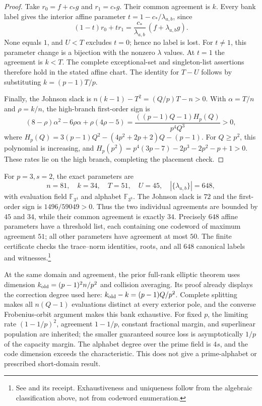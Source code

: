 \begin{proof}
Take $r_0=f+c_*g$ and $r_1=c_*g$. Their common agreement is $k$.
Every bank label gives the interior affine parameter
$t=1-c_*/\lambda_{a,b}$, since
\[
 (1-t)r_0+tr_1
 =\frac{c_*}{\lambda_{a,b}}\,(f+\lambda_{a,b}g).
\]
None equals $1$, and $U<T$ excludes $t=0$; hence no label is lost.
For $t\ne1$, this parameter change is a bijection with the
nonzero $\lambda$ values. At $t=1$ the agreement is $k<T$.
The complete exceptional-set and singleton-list assertions
therefore hold in the stated affine chart.
The identity for $T-U$ follows by substituting $k=(p-1)T/p$.

Finally, the Johnson slack is $n(k-1)-T^2=(Q/p)T-n>0$.
With $\alpha=T/n$ and $\rho=k/n$, the high-branch first-order sign is
\[
 (8-\rho)\alpha^2-6\rho\alpha+\rho(4\rho-5)
 =\frac{((p-1)Q-1)H_p(Q)}{p^4Q^3}>0,
\]
where $H_p(Q)=3(p-1)Q^2-(4p^2+2p+2)Q-(p-1)$.
For $Q\ge p^2$, this polynomial is increasing, and
$H_p(p^2)=p^4(3p-7)-2p^3-2p^2-p+1>0$.
These rates lie on the high branch, completing the placement check.
\end{proof}

For $p=3,s=2$, the exact parameters are
\[
 n=81,\quad k=34,\quad T=51,\quad U=45,\quad
 |\{\lambda_{a,b}\}|=648,
\]
with evaluation field $\mathbb F_{3^4}$ and alphabet $\mathbb F_{3^8}$.
The Johnson slack is $72$ and the first-order sign is
$1496/59049>0$. Thus the two individual agreements are bounded by
$45$ and $34$, while their common agreement is exactly $34$.
Precisely $648$ affine parameters have a threshold list, each
containing one codeword of maximum agreement $51$; all other
parameters have agreement at most $50$.
The finite certificate checks the trace--norm identities, roots, and
all $648$ canonical labels and witnesses.\footnote{See
and its receipt. Exhaustiveness and uniqueness follow from the
algebraic classification above, not from codeword enumeration.}

At the same domain and agreement, the prior full-rank elliptic theorem
uses dimension $k_{\rm old}=(p-1)^2n/p^2$ and collision averaging.
Its proof already displays the correction degree used here:
$k_{\rm old}-k=(p-1)Q/p^2$. Complete splitting makes all
$n(Q-1)$ evaluations distinct at every exterior pole, and the
converse Frobenius-orbit argument makes this bank exhaustive.
For fixed $p$, the limiting rate $(1-1/p)^2$, agreement $1-1/p$,
constant fractional margin, and superlinear population are inherited;
the smaller guaranteed source loss is asymptotically $1/p$ of the
capacity margin. The alphabet degree over the prime field is $4s$,
and the code dimension exceeds the characteristic. This does not give
a prime-alphabet or prescribed short-domain result.
